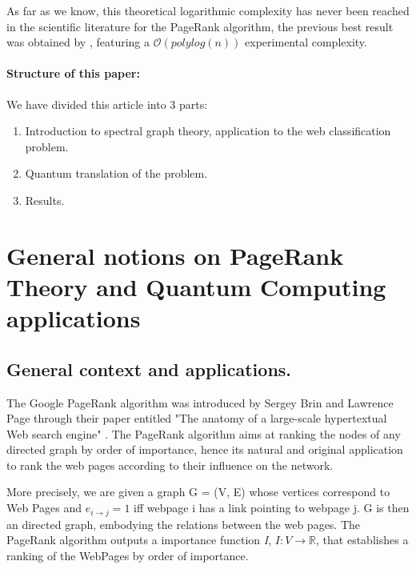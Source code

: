 \documentclass[sn-mathphys]{sn-jnl}%
\theoremstyle{thmstyleone}%
\theoremstyle{thmstyletwo}%
\theoremstyle{thmstylethree}%
\begin{document}
As far as we know, this theoretical logarithmic complexity has never
been reached in the scientific literature for the PageRank algorithm,
the previous best result was obtained by
\cite{garnerone_zanardi_lidar_2012}, featuring a
$\mathcal{O}(polylog(n))$ experimental complexity.


\paragraph{Structure of this paper:}
We have divided this article into 3 parts:
\begin{enumerate}
    \item Introduction to spectral graph theory, application to the web classification problem.
    \item Quantum translation of the problem.
    \item Results.
\end{enumerate}

\newpage

\tableofcontents

\newpage


\section{General notions on PageRank Theory and Quantum Computing applications}
\label{sec:previousResults}

\subsection{General context and applications.}
The Google PageRank algorithm was introduced by Sergey Brin and
Lawrence Page through their paper entitled "The anatomy of a
large-scale hypertextual Web search engine" \cite{brin_page_1998}. The
PageRank algorithm aims at ranking the nodes of any directed graph by
order of importance, hence its natural and original application to
rank the web pages according to their influence on the network.

More precisely, we are given a graph G = (V, E) whose vertices
correspond to Web Pages and $e_{i \rightarrow j} = 1$ iff webpage i
has a link pointing to webpage j. G is then an directed graph,
embodying the relations between the web pages. The PageRank algorithm
outputs a importance function \emph{I}, $I:V \rightarrow \mathbb{R}$,
that establishes a ranking of the WebPages by order of importance.
\end{document}
